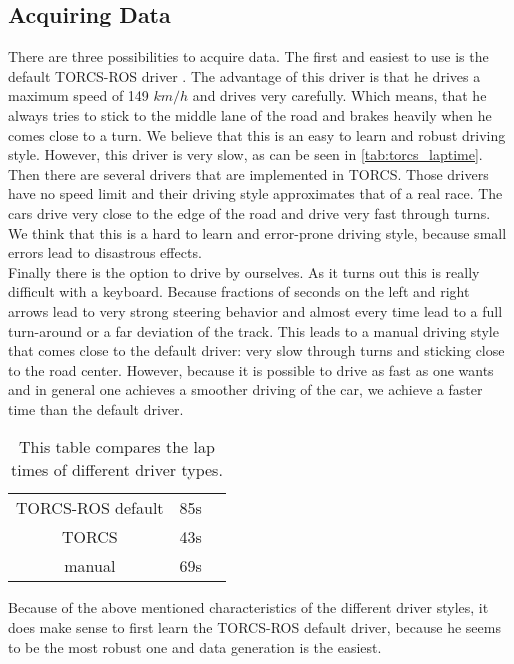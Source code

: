 \documentclass[10pt,a4paper,twoside,journal]{IEEEtran}
\begin{document}
\subsection{Acquiring Data}
There are three possibilities to acquire data. The first and easiest to use is the default TORCS-ROS driver \cite{mirus_torcs-ros_2017}. The advantage of this driver is that he drives a maximum speed of 149 $km/h$ and drives very carefully. Which means, that he always tries to stick to the middle lane of the road and brakes heavily when he comes close to a turn. We believe that this is an easy to learn and robust driving style. However, this driver is very slow, as can be seen in \autoref{tab:torcs_laptime}. \\
Then there are several drivers that are implemented in TORCS. Those drivers have no speed limit and their driving style approximates that of a real race. The cars drive very close to the edge of the road and drive very fast through turns. We think that this is a hard to learn and error-prone driving style, because small errors lead to disastrous effects. \\
Finally there is the option to drive by ourselves. As it turns out this is really difficult with a keyboard. Because fractions of seconds on the left and right arrows lead to very strong steering behavior and almost every time lead to a full turn-around or a far deviation of the track. This leads to a manual driving style that comes close to the default driver: very slow through turns and sticking close to the road center. However, because it is possible to drive as fast as one wants and in general one achieves a smoother driving of the car, we achieve a faster time than the default driver. \\
\begin{table}
	\begin{center}
		\begin{tabular}{ |c|c|c| } 
			\hline
			TORCS-ROS default & 85s \\
			TORCS  & 43s  \\
			manual & 69s \\
			\hline
		\end{tabular}
		\caption{\label{tab:torcs_laptime}This table compares the lap times of different driver types.}
	\end{center}
\end{table}
Because of the above mentioned characteristics of the different driver styles, it does make sense to first learn the TORCS-ROS default driver, because he seems to be the most robust one and data generation is the easiest.
\end{document}

